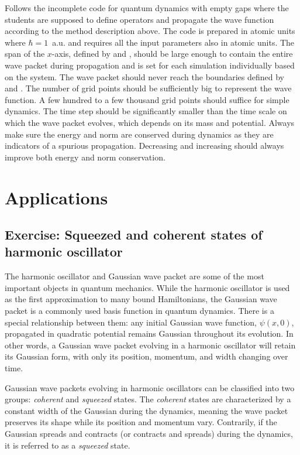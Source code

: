 Follows the incomplete code for quantum dynamics with empty gaps where the students are supposed to define operators and propagate the wave function according to the method description above. The code is prepared in atomic units where $\hbar=1$~a.u. and requires all the input parameters also in atomic units. The span of the $x$-axis, defined by  and , should be large enough to contain the entire wave packet during propagation and is set for each simulation individually based on the system. The wave packet should never reach the boundaries defined by  and . The number of grid points should be sufficiently big to represent the wave function. A few hundred to a few thousand grid points should suffice for simple dynamics. The time step  should be significantly smaller than the time scale on which the wave packet evolves, which depends on its mass and potential. Always make sure the energy and norm are conserved during dynamics as they are indicators of a spurious propagation. Decreasing  and increasing  should always improve both energy and norm conservation. 

\lstset{style=mystyle}


\section{Applications}

\subsection*{Exercise: Squeezed and coherent states of harmonic oscillator}

The harmonic oscillator and Gaussian wave packet are some of the most important objects in quantum mechanics. While the harmonic oscillator is used as the first approximation to many bound Hamiltonians, the Gaussian wave packet is a commonly used basis function in quantum dynamics. There is a special relationship between them: any initial Gaussian wave function, $\psi(x,0)$, propagated in quadratic potential remains Gaussian throughout its evolution. In other words, a Gaussian wave packet evolving in a harmonic oscillator will retain its Gaussian form, with only its position, momentum, and width changing over time.

Gaussian wave packets evolving in harmonic oscillators can be classified into two groups: \textit{coherent} and \textit{squeezed} states. The \textit{coherent} states are characterized by a constant width of the Gaussian during the dynamics, meaning the wave packet preserves its shape while its position and momentum vary. Contrarily, if the Gaussian spreads and contracts (or contracts and spreads) during the dynamics, it is referred to as a \textit{squeezed} state.

